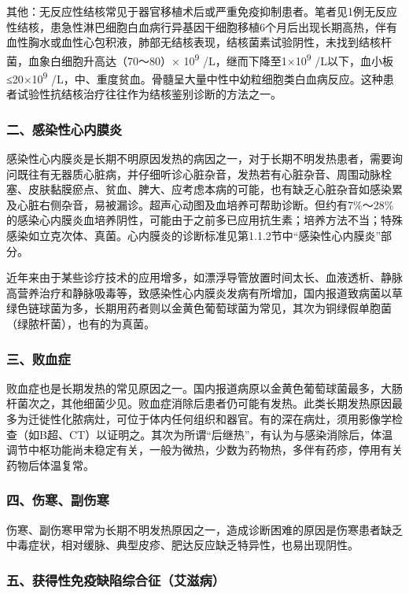 其他：无反应性结核常见于器官移植术后或严重免疫抑制患者。笔者见1例无反应性结核，患急性淋巴细胞白血病行异基因干细胞移植6个月后出现长期高热，伴有血性胸水或血性心包积液，肺部无结核表现，结核菌素试验阴性，未找到结核杆菌，血象白细胞升高达（70～80）×
10\textsuperscript{9} /L，继而下降至1×10\textsuperscript{9}
/L以下，血小板≤20×10\textsuperscript{9}
/L，中、重度贫血。骨髓呈大量中性中幼粒细胞类白血病反应。这种患者试验性抗结核治疗往往作为结核鉴别诊断的方法之一。

\subsubsection{二、感染性心内膜炎}

感染性心内膜炎是长期不明原因发热的病因之一，对于长期不明发热患者，需要询问既往有无器质心脏病，并仔细听诊心脏杂音，发热若有心脏杂音、周围动脉栓塞、皮肤黏膜瘀点、贫血、脾大、应考虑本病的可能，也有缺乏心脏杂音如感染累及心脏右侧杂音，易被漏诊。超声心动图及血培养可帮助诊断。但约有7\%～28\%的感染心内膜炎血培养阴性，可能由于之前多已应用抗生素；培养方法不当；特殊感染如立克次体、真菌。心内膜炎的诊断标准见第1.1.2节中“感染性心内膜炎”部分。

近年来由于某些诊疗技术的应用增多，如漂浮导管放置时间太长、血液透析、静脉高营养治疗和静脉吸毒等，致感染性心内膜炎发病有所增加，国内报道致病菌以草绿色链球菌为多，长期用药者则以金黄色葡萄球菌为常见，其次为铜绿假单胞菌（绿脓杆菌），也有的为真菌。

\subsubsection{三、败血症}

败血症也是长期发热的常见原因之一。国内报道病原以金黄色葡萄球菌最多，大肠杆菌次之，其他细菌少见。败血症消除后患者仍可能有发热。此类长期发热原因最多为迁徙性化脓病灶，可位于体内任何组织和器官。有的深在病灶，须用影像学检查（如B超、CT）以证明之。其次为所谓“后继热”，有认为与感染消除后，体温调节中枢功能尚未稳定有关，一般为微热，少数为药物热，多伴有药疹，停用有关药物后体温复常。

\subsubsection{四、伤寒、副伤寒}

伤寒、副伤寒甲常为长期不明发热原因之一，造成诊断困难的原因是伤寒患者缺乏中毒症状，相对缓脉、典型皮疹、肥达反应缺乏特异性，也易出现阴性。

\subsubsection{五、获得性免疫缺陷综合征（艾滋病）}

